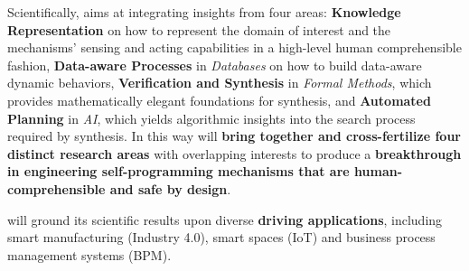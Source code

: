 








Scientifically, \project aims at integrating insights from four areas:
\textbf{Knowledge Representation} on how to represent the domain
of interest and the mechanisms' sensing and acting capabilities in a
high-level human comprehensible fashion,
\textbf{Data-aware Processes} in \emph{Databases} on how to
build data-aware dynamic behaviors,
\textbf{Verification and Synthesis} in \emph{Formal
  Methods}, which provides mathematically elegant foundations for
synthesis,
and \textbf{Automated Planning} in \emph{AI}, which yields
algorithmic insights into the search process required by synthesis.
%
In this way \project will \textbf{bring together and cross-fertilize
  four distinct research areas} with overlapping interests to produce a \textbf{breakthrough in engineering self-programming mechanisms that are human-comprehensible and safe by design}.


\project will ground its scientific results upon diverse
\textbf{driving applications}, including smart manufacturing
(Industry 4.0), smart spaces (IoT) and business process management systems
(BPM).

 


